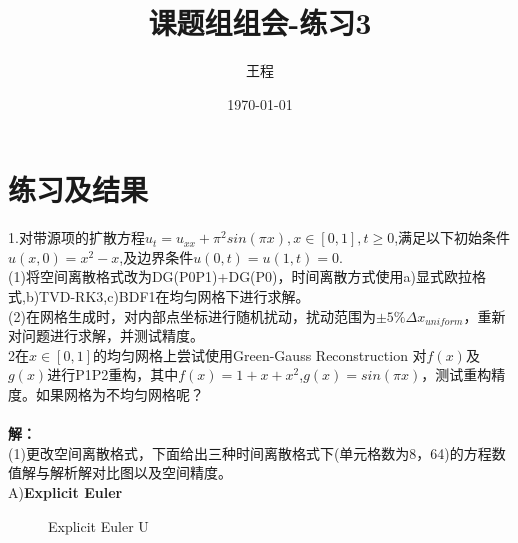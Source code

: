 \documentclass[a4paper,11pt,UTF8]{article}%
\theoremstyle{plain}
\begin{document}
	\title{\heiti 课题组组会-练习3}
	\author{王程 }
	\date{\today}
	\maketitle
	
	\section{练习及结果}
	1.对带源项的扩散方程$u_t=u_{xx}+\pi^2sin\left(\pi x\right),x\in \left[0,1\right],t\geq0$,满足以下初始条件$u\left(x,0\right)=x^2-x$,及边界条件$u\left(0,t\right)=u\left(1,t\right)=0$.\\
	\indent(1)将空间离散格式改为DG(P0P1)+DG(P0)，时间离散方式使用a)显式欧拉格式,b)TVD-RK3,c)BDF1在均匀网格下进行求解。\\
	\indent(2)在网格生成时，对内部点坐标进行随机扰动，扰动范围为$\pm5\%\Delta x_{uniform}$，重新对问题进行求解，并测试精度。\\
	\indent 2在$x\in \left[0,1\right]$的均匀网格上尝试使用Green-Gauss Reconstruction 对$f\left(x\right)$及$g\left(x\right)$进行P1P2重构，其中$f\left(x\right)=1+x+x^2$,$g\left(x\right)=sin\left(\pi x\right)$，测试重构精度。如果网格为不均匀网格呢？ \\
	~\\
	
	\textbf{解：}\\
	\indent(1)更改空间离散格式，下面给出三种时间离散格式下(单元格数为8，64)的方程数值解与解析解对比图以及空间精度。\\
	A)\textbf{Explicit Euler}\\
		\begin{figure}[!h]
		\centering
		\hfill
{}
		\caption{Explicit Euler U}
	\end{figure}\\
	
\end{document}
